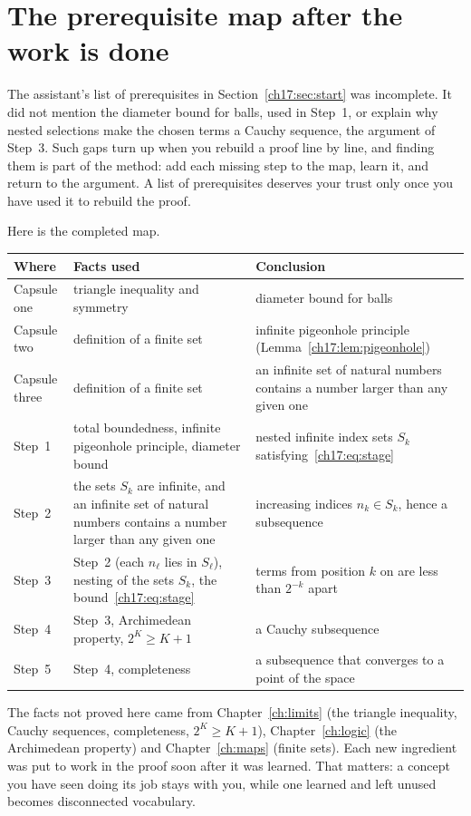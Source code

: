 \section{The prerequisite map after the work is done}\label{ch17:sec:map}
The assistant's list of prerequisites in Section~\ref{ch17:sec:start} was incomplete. It did not mention the diameter bound for balls, used in Step~1, or explain why nested selections make the chosen terms a Cauchy sequence, the argument of Step~3. Such gaps turn up when you rebuild a proof line by line, and finding them is part of the method: add each missing step to the map, learn it, and return to the argument. A list of prerequisites deserves your trust only once you have used it to rebuild the proof.

Here is the completed map.
\begin{center}
\begin{tabularx}{\linewidth}{@{}l>{\raggedright\arraybackslash}X>{\raggedright\arraybackslash}X@{}}
\toprule
Where & Facts used & Conclusion\\
\midrule
Capsule one & triangle inequality and symmetry & diameter bound for balls\\
Capsule two & definition of a finite set & infinite pigeonhole principle (Lemma~\ref{ch17:lem:pigeonhole})\\
Capsule three & definition of a finite set & an infinite set of natural numbers contains a number larger than any given one\\
Step~1 & total boundedness, infinite pigeonhole principle, diameter bound & nested infinite index sets $S_k$ satisfying~\eqref{ch17:eq:stage}\\
Step~2 & the sets $S_k$ are infinite, and an infinite set of natural numbers contains a number larger than any given one & increasing indices $n_k\in S_k$, hence a subsequence\\
Step~3 & Step~2 (each $n_\ell$ lies in $S_\ell$), nesting of the sets $S_k$, the bound~\eqref{ch17:eq:stage} & terms from position $k$ on are less than $2^{-k}$ apart\\
Step~4 & Step~3, Archimedean property, $2^K\ge K+1$ & a Cauchy subsequence\\
Step~5 & Step~4, completeness & a subsequence that converges to a point of the space\\
\bottomrule
\end{tabularx}
\end{center}
The facts not proved here came from Chapter~\ref{ch:limits} (the triangle inequality, Cauchy sequences, completeness, $2^K\ge K+1$), Chapter~\ref{ch:logic} (the Archimedean property) and Chapter~\ref{ch:maps} (finite sets). Each new ingredient was put to work in the proof soon after it was learned. That matters: a concept you have seen doing its job stays with you, while one learned and left unused becomes disconnected vocabulary.

